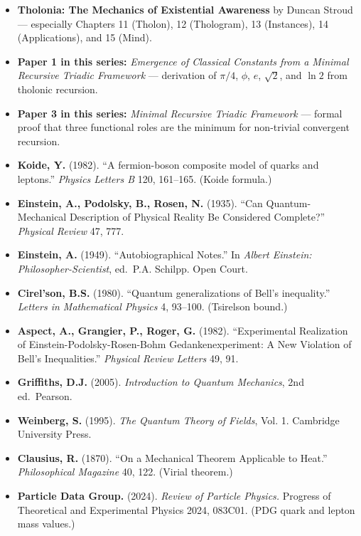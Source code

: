 \documentclass[
  11pt,
  letterpaper,
]{article}
\providecommand{\tightlist}{%
  \setlength{\itemsep}{0pt}\setlength{\parskip}{0pt}}
\begin{document}
\begin{itemize}
\tightlist
\item
  \textbf{Tholonia: The Mechanics of Existential Awareness} by Duncan
  Stroud --- especially Chapters 11 (Tholon), 12 (Thologram), 13
  (Instances), 14 (Applications), and 15 (Mind).
\item
  \textbf{Paper 1 in this series:} \emph{Emergence of Classical
  Constants from a Minimal Recursive Triadic Framework} --- derivation
  of \(\pi/4\), \(\phi\), \(e\), \(\sqrt{2}\), and \(\ln 2\) from
  tholonic recursion.
\item
  \textbf{Paper 3 in this series:} \emph{Minimal Recursive Triadic
  Framework} --- formal proof that three functional roles are the
  minimum for non-trivial convergent recursion.
\item
  \textbf{Koide, Y.} (1982). ``A fermion-boson composite model of quarks
  and leptons.'' \emph{Physics Letters B} 120, 161--165. (Koide
  formula.)
\item
  \textbf{Einstein, A., Podolsky, B., Rosen, N.} (1935). ``Can
  Quantum-Mechanical Description of Physical Reality Be Considered
  Complete?'' \emph{Physical Review} 47, 777.
\item
  \textbf{Einstein, A.} (1949). ``Autobiographical Notes.'' In
  \emph{Albert Einstein: Philosopher-Scientist}, ed.~P.A. Schilpp. Open
  Court.
\item
  \textbf{Cirel'son, B.S.} (1980). ``Quantum generalizations of Bell's
  inequality.'' \emph{Letters in Mathematical Physics} 4, 93--100.
  (Tsirelson bound.)
\item
  \textbf{Aspect, A., Grangier, P., Roger, G.} (1982). ``Experimental
  Realization of Einstein-Podolsky-Rosen-Bohm Gedankenexperiment: A New
  Violation of Bell's Inequalities.'' \emph{Physical Review Letters} 49,
  91.
\item
  \textbf{Griffiths, D.J.} (2005). \emph{Introduction to Quantum
  Mechanics}, 2nd ed.~Pearson.
\item
  \textbf{Weinberg, S.} (1995). \emph{The Quantum Theory of Fields},
  Vol. 1. Cambridge University Press.
\item
  \textbf{Clausius, R.} (1870). ``On a Mechanical Theorem Applicable to
  Heat.'' \emph{Philosophical Magazine} 40, 122. (Virial theorem.)
\item
  \textbf{Particle Data Group.} (2024). \emph{Review of Particle
  Physics.} Progress of Theoretical and Experimental Physics 2024,
  083C01. (PDG quark and lepton mass values.)
\end{itemize}
\end{document}
